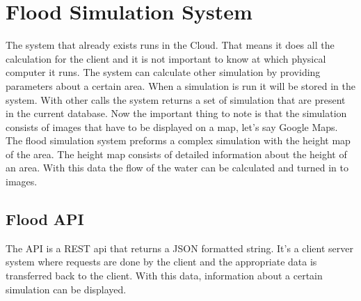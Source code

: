 \documentclass[10pt,a4paper]{article}
\begin{document}
\section{Flood Simulation System}
The system that already exists runs in the Cloud. That means it does all the calculation for the client and it is not important to know at which physical computer it runs. The system can calculate other simulation by providing parameters about a certain area. When a simulation is run it will be stored in the system. With other calls the system returns a set of simulation that are present in the current database. Now the important thing to note is that the simulation consists of images that have to be displayed on a map, let's say Google Maps. The flood simulation system preforms a complex simulation with the height map of the area. The height map consists of detailed information about the height of an area. With this data the flow of the water can be calculated and turned in to images.
 
\subsection{Flood API}
The API is a REST api that returns a JSON formatted string. It's a client server system where requests are done by the client and the appropriate data is transferred back to the client. With this data, information about a certain simulation can be displayed. 
\end{document}
